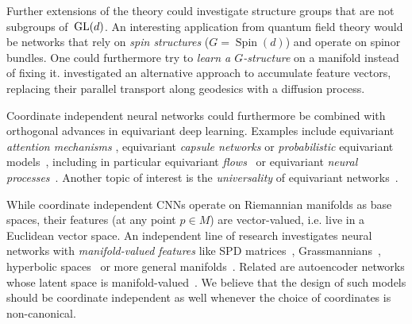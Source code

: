 Further extensions of the theory could investigate structure groups that are not subgroups of~$\operatorname{GL}(d)$.
An interesting application from quantum field theory would be networks that rely on \emph{spin structures} ($G={\operatorname{Spin}(d)}$) and operate on spinor bundles.
One could furthermore try to \emph{learn a $G$-structure} on a manifold instead of fixing it.
\citet{sommer2019horizontal} investigated an alternative approach to accumulate feature vectors, replacing their parallel transport along geodesics with a diffusion process.


Coordinate independent neural networks could furthermore be combined with orthogonal advances in equivariant deep learning.
Examples include equivariant \emph{attention mechanisms} \cite{hutchinson2020lietransformer,romero2020attentive,romero2020selfAttention,Romero2020CoAttentive,fuchs2020se3transformers,fuchs2021iterative},
equivariant \emph{capsule networks} \cite{lenssen2018groupCapsule,zhao2019quaternion,venkataraman2020equivCapsule}
or \emph{probabilistic} equivariant models~\cite{bloem2019probabilistic},
including in particular equivariant \emph{flows}~\cite{kohler2020equivariant,rezende2019equivariant,li2020exchangeable} or equivariant \emph{neural processes}~\cite{finzi2020probabilistic,holderrieth2020steerableCNP,kawano2021GCNN_CNP}.
Another topic of interest is the \emph{universality} of equivariant networks~\cite{yarotsky2018universal,maron2019universality,sannai2019universalPermutation,keriven2019universal,segol2020universalSet,ravanbakhsh2020universal,kumagai2020universal,dym2020universality}.


While coordinate independent CNNs operate on Riemannian manifolds as base spaces, their features (at any point $p\in M$) are vector-valued, i.e. live in a Euclidean vector space.
An independent line of research investigates neural networks with \emph{manifold-valued features}
like SPD matrices~\cite{huang2017riemannian},
Grassmannians~\cite{huang2018building},
hyperbolic spaces~\cite{ganea2018hyperbolic,peng2021hyperbolic,chami2019hyperbolic,liu2019hyperbolic,gulcehre2018hyperbolic,shimizu2020hyperbolic}
or more general manifolds~\cite{chakraborty2018manifoldnet,banerjee2020volterranet,pfau2020disentangling}.
Related are autoencoder networks whose latent space is manifold-valued~\cite{davidson2018hyperspherical,falorsi2018explorations,de2018topological,schonsheck2019chart}.
We believe that the design of such models should be coordinate independent as well whenever the choice of coordinates is non-canonical.


